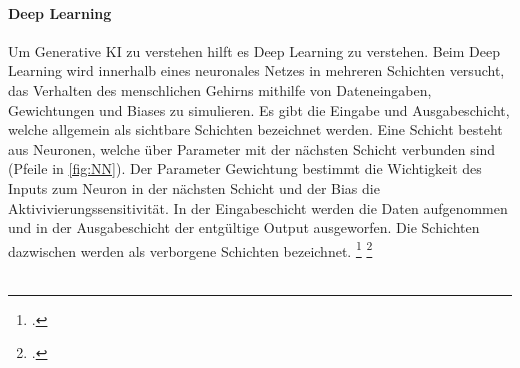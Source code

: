 \paragraph{Deep Learning}
Um Generative KI zu verstehen hilft es Deep Learning zu verstehen.
Beim Deep Learning wird innerhalb eines neuronales Netzes in
mehreren Schichten versucht, 
das Verhalten des menschlichen Gehirns mithilfe von Dateneingaben, 
Gewichtungen und Biases zu simulieren. 
Es gibt die Eingabe und Ausgabeschicht, 
welche allgemein als sichtbare Schichten bezeichnet werden.
Eine Schicht besteht aus Neuronen, welche über Parameter 
mit der nächsten Schicht verbunden sind (Pfeile in \ref{fig:NN}).
Der Parameter Gewichtung bestimmt die Wichtigkeit des Inputs 
zum Neuron in der nächsten Schicht und der Bias die Aktivivierungssensitivität.
In der Eingabeschicht werden die Daten aufgenommen und 
in der Ausgabeschicht der entgültige Output ausgeworfen.
Die Schichten dazwischen werden als verborgene Schichten bezeichnet.
\footcite{WasIstDeep2023}
\footcite{KuenstlicheIntelligenz}
\\
\\
